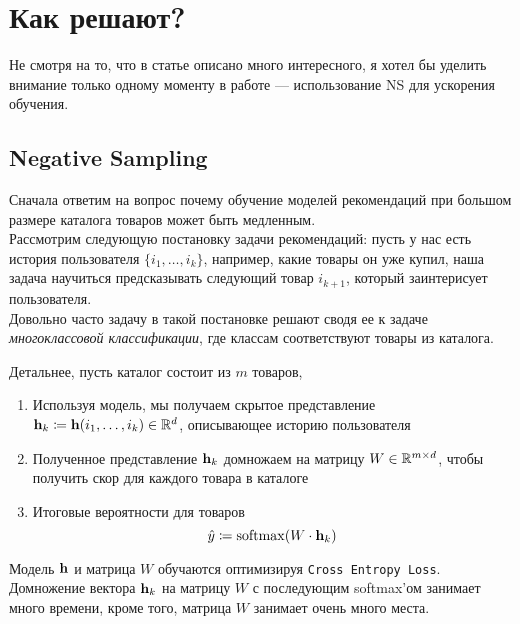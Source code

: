 \section{Как решают?}

Не смотря на то, что в статье описано много интересного, я хотел бы уделить внимание только одному моменту в работе --- использование NS для ускорения обучения.

\subsection{Negative Sampling}

Сначала ответим на вопрос почему обучение моделей рекомендаций при большом размере каталога товаров может быть медленным. \\

Рассмотрим следующую постановку задачи рекомендаций: пусть у нас есть история пользователя $ \{i_1, \ldots, i_k \} $, например, какие товары он уже купил, наша задача научиться предсказывать следующий товар $i_{k+1}$, который заинтерисует пользователя. \\

Довольно часто задачу в такой постановке решают сводя ее к задаче \textit{многоклассовой классификации}, где классам соответствуют товары из каталога. 

Детальнее, пусть каталог состоит из $m$ товаров,
\begin{enumerate}
    \item Используя модель, мы получаем скрытое представление ${\bf h}_k \coloneqq {\bf h}(i_1, \ldots, i_k) \in \mathbb{R}^{d} $, описывающее историю пользователя
    \item Полученное представление ${\bf h}_k$ домножаем на матрицу $W \in \mathbb{R}^{m \times d}$, чтобы получить скор для каждого товара в каталоге
    \item Итоговые вероятности для товаров 
        \begin{equation*}
            \hat{y} \coloneqq \operatorname*{softmax} (W \cdot {\bf h}_k)
        \end{equation*}
\end{enumerate}

Модель ${\bf h}$ и матрица $W$ обучаются оптимизируя \texttt{Cross Entropy Loss}. \\

Домножение вектора ${\bf h}_k$ на матрицу $W$ с последующим softmax'ом занимает много времени, кроме того, матрица $W$ занимает очень много места. \\

